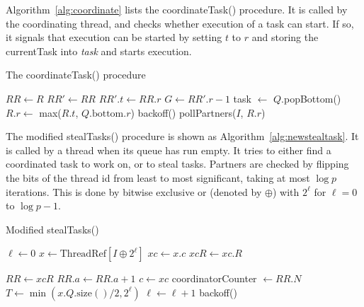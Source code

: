 \documentclass[preprint]{sigplanconf}
\begin{document}
Algorithm~\ref{alg:coordinate} lists the coordinateTask()
procedure.  It is called by the coordinating thread, and checks
whether execution of a task can start. If so, it signals that
execution can be started by setting $t$ to $r$ and storing the
currentTask into \emph{task} and starts execution.

\begin{algorithm}
\caption{The coordinateTask() procedure}\label{alg:coordinate}
\begin{algorithmic}[1]
\REPEAT
\STATE $RR \gets R$
	\STATE {}
	\STATE $RR'\gets RR$
	\STATE $RR'.t \gets RR.r$
		\STATE {}
		\STATE $G \gets RR'.r-1$
		\STATE task $\gets$ $Q$.popBottom()
		\STATE $R.r\gets$ max($R.t$, $Q.\mbox{bottom}.r$)
	\ELSE
		\STATE backoff()
	\ENDIF
\ELSE
	\STATE pollPartners($I$, $R.r$)
\ENDIF
{}
\end{algorithmic}
\end{algorithm}

The modified stealTasks() procedure is shown as
Algorithm~\ref{alg:newstealtask}.  It is called by a thread when its
queue has run empty. It tries to either find a coordinated task to
work on, or to steal tasks.  Partners are checked by flipping the bits
of the thread id from least to most significant, taking at most $\log
p$ iterations. This is done by bitwise exclusive or (denoted by
$\oplus$) with $2^{\ell}$ for $\ell=0$ to $\log p-1$.

\begin{algorithm}
\caption{Modified stealTasks()}\label{alg:newstealtask}
\begin{algorithmic}[1]
\STATE $\ell\gets 0$
	\STATE $x \gets \mbox{ThreadRef}[I \oplus 2^{\ell}]$ 
	\STATE $xc \gets x.c$ 
	\STATE $xcR \gets xc.R$ 
		
		\STATE $RR \gets xcR$
		\STATE $RR.a \gets RR.a+1$ 
			\STATE {}
			\STATE $c \gets xc$ 
			\STATE coordinatorCounter $\gets RR.N$ 
			\RETURN
		\ENDIF
	\ELSE
	\STATE{}
		\STATE $T \gets\min(x.Q.\mbox{size}() / 2, 2^{\ell})$
			\STATE {}
			\RETURN
		\ENDIF
		\STATE{}
		\STATE $\ell\gets\ell+1$
	\ENDIF
\ENDWHILE
\STATE {}
\STATE backoff()
\end{algorithmic}
\end{algorithm}
\end{document}
